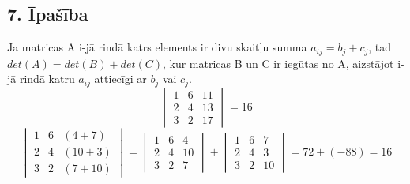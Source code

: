 \documentclass{article}
\begin{document}
\subsection*{7. Īpašība}
Ja matricas A i-jā rindā katrs elements ir divu skaitļu summa $a_{ij}=b_{j}+c_{j}$, tad $det(A)=det(B)+det(C)$, kur matricas B un C ir iegūtas no A, aizstājot i-jā rindā katru $a_{ij}$ attiecīgi ar $b_{j}$ vai $c_{j}$.
\begin{equation*}
    \begin{vmatrix}
        1 & 6 & 11\\
        2 & 4 & 13\\
        3 & 2 & 17
    \end{vmatrix}
    =
    16
\end{equation*}
\begin{equation*}
    \begin{vmatrix}
        1 & 6 & (4 + 7)\\
        2 & 4 & (10 + 3)\\
        3 & 2 & (7 + 10)
    \end{vmatrix}
    =
    \begin{vmatrix}
        1 & 6 & 4\\
        2 & 4 & 10\\
        3 & 2 & 7
    \end{vmatrix}
    +
    \begin{vmatrix}
        1 & 6 & 7\\
        2 & 4 & 3\\
        3 & 2 & 10
    \end{vmatrix}
    =
    72 + (-88)
    =
    16
\end{equation*}
\end{document}
